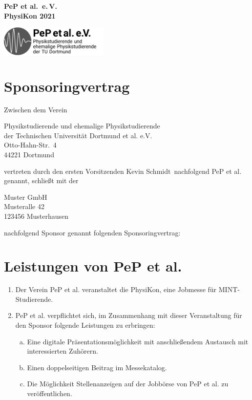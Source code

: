 \documentclass[
  paper=a4,
  fontsize=12pt,
  DIV=16,
  parskip=full,
  headinclude=true,
]{scrartcl}
\date{11. April 2021}
\newcommand\vorsitzender{Kevin Schmidt}
\begin{document}
  \begin{minipage}{0.45\textwidth}%
    \large\bfseries PeP et al.\ e.\,V.\\%
    PhysiKon 2021
  \end{minipage}%
  \hfill%
  \begin{minipage}{0.45\textwidth}%
  \hfill\includegraphics[height=1.5cm]{../logos/pep.pdf}
  \end{minipage}%
\section*{Sponsoringvertrag}

Zwischen dem Verein

Physikstudierende und ehemalige Physikstudierende\\
der Technischen Universität Dortmund et al. e.V.\\
Otto-Hahn-Str.~4\\
44221 Dortmund

vertreten durch den ersten Vorsitzenden \vorsitzender\ nachfolgend
PeP et al. genannt, schließt mit der

Muster GmbH\\
Musteralle 42\\
123456 Musterhausen

nachfolgend Sponsor genannt folgenden Sponsoringvertrag:

\section{Leistungen von PeP et al.}

\begin{enumerate}[\qquad(1)]
  \item Der Verein PeP et al. veranstaltet die PhysiKon, eine Jobmesse für
        MINT-Studierende.
  \item PeP et al. verpflichtet sich, im Zusammenhang mit dieser
        Veranstaltung für den Sponsor folgende Leistungen zu erbringen:
        \begin{enumerate}[(a)]
          \item Eine digitale Präsentationsmöglichkeit mit anschließendem
                Austausch mit interessierten Zuhörern.
          \item Einen doppelseitigen Beitrag im Messekatalog.
          \item Die Möglichkeit Stellenanzeigen auf der Jobbörse von PeP et al.
                zu veröffentlichen.
        \end{enumerate}
\end{enumerate}
\end{document}
